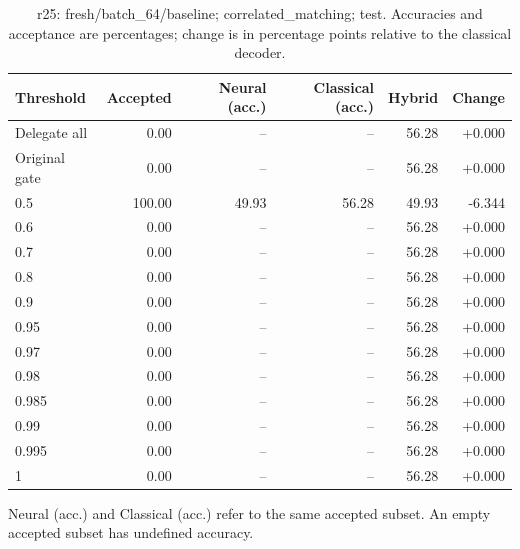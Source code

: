 \begin{table}[htbp]
\centering\small
\setlength{\tabcolsep}{3pt}
\caption{r25: fresh/batch\_64/baseline; correlated\_matching; test. Accuracies and acceptance are percentages; change is in percentage points relative to the classical decoder.}
\begin{tabular}{lrrrrr}
\toprule
Threshold & Accepted & Neural (acc.) & Classical (acc.) & Hybrid & Change \\
\midrule
Delegate all & 0.00 & -- & -- & 56.28 & +0.000 \\
Original gate & 0.00 & -- & -- & 56.28 & +0.000 \\
0.5 & 100.00 & 49.93 & 56.28 & 49.93 & -6.344 \\
0.6 & 0.00 & -- & -- & 56.28 & +0.000 \\
0.7 & 0.00 & -- & -- & 56.28 & +0.000 \\
0.8 & 0.00 & -- & -- & 56.28 & +0.000 \\
0.9 & 0.00 & -- & -- & 56.28 & +0.000 \\
0.95 & 0.00 & -- & -- & 56.28 & +0.000 \\
0.97 & 0.00 & -- & -- & 56.28 & +0.000 \\
0.98 & 0.00 & -- & -- & 56.28 & +0.000 \\
0.985 & 0.00 & -- & -- & 56.28 & +0.000 \\
0.99 & 0.00 & -- & -- & 56.28 & +0.000 \\
0.995 & 0.00 & -- & -- & 56.28 & +0.000 \\
1 & 0.00 & -- & -- & 56.28 & +0.000 \\
\bottomrule
\end{tabular}
\par\smallskip\footnotesize Neural (acc.) and Classical (acc.) refer to the same accepted subset. An empty accepted subset has undefined accuracy.
\end{table}
